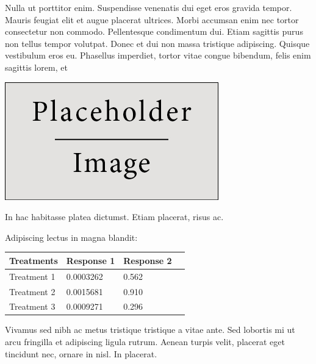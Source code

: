 \documentclass[a0,portrait]{a0poster}
\begin{document}
\begin{multicols}{2}
Nulla ut porttitor enim. Suspendisse venenatis dui eget eros gravida tempor. Mauris feugiat elit et augue placerat ultrices. Morbi accumsan enim nec tortor consectetur non commodo. Pellentesque condimentum dui. Etiam sagittis purus non tellus tempor volutpat. Donec et dui non massa tristique adipiscing. Quisque vestibulum eros eu. Phasellus imperdiet, tortor vitae congue bibendum, felis enim sagittis lorem, et 

\begin{center}\vspace{1cm}
\includegraphics[width=0.8\linewidth]{placeholder}
\end{center}\vspace{1cm}

In hac habitasse platea dictumst. Etiam placerat, risus ac.

Adipiscing lectus in magna blandit:

\begin{center}\vspace{1cm}
\begin{tabular}{l l l l}
\toprule
\textbf{Treatments} & \textbf{Response 1} & \textbf{Response 2} \\
\midrule
Treatment 1 & 0.0003262 & 0.562 \\
Treatment 2 & 0.0015681 & 0.910 \\
Treatment 3 & 0.0009271 & 0.296 \\
\bottomrule
\end{tabular}
\end{center}\vspace{1cm}

Vivamus sed nibh ac metus tristique tristique a vitae ante. Sed lobortis mi ut arcu fringilla et adipiscing ligula rutrum. Aenean turpis velit, placerat eget tincidunt nec, ornare in nisl. In placerat.


\end{multicols}
\end{document}
